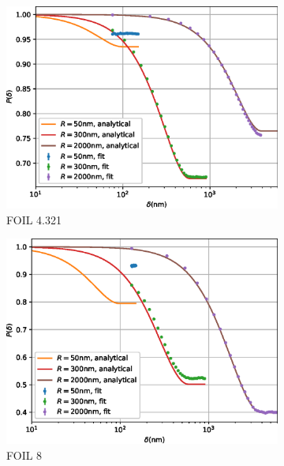 \documentclass{article}
\begin{document}
\begin{figure}[p]
	\centering
	\begin{subfigure}[b]{0.45\textwidth}
		\centering
		\includegraphics[width=\textwidth]{simulation-plot-gauss-FOIL-4.321}
		\caption{FOIL 4.321}
		\label{fig:simulation-plot-gauss-FOIL-4.321}
	\end{subfigure}
	\hfill
	\begin{subfigure}[b]{0.45\textwidth}
		\centering
		\includegraphics[width=\textwidth]{simulation-plot-gauss-FOIL-8}
		\caption{FOIL 8}
		\label{fig:simulation-plot-gauss-FOIL-8}
	\end{subfigure}
	\centering
	\begin{subfigure}[b]{0.45\textwidth}
		\centering

\end{subfigure}
\end{figure}
\end{document}
